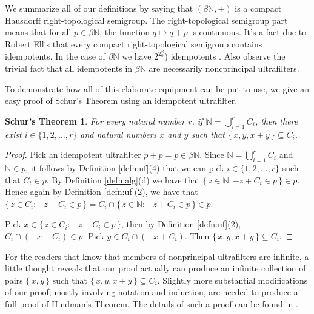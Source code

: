 \documentclass[12pt]{article}
\theoremstyle{plain}
\newtheorem{schur}[thm]{Schur's Theorem}
\theoremstyle{definition}
\newcommand{\bbN}{\mathbb{N}}
\begin{document}
We summarize all of our definitions by saying that $(\beta\bbN,
+)$ is a compact Hausdorff right-topological semigroup. 
The right-topological semigroup part means that for all $p \in
\beta\bbN$, the function $q \mapsto q+p$ is continuous.
It's a fact due to Robert Ellis \cite[Corollary 2.10]{Ellis:1969zr}
that every compact right-topological semigroup contains idempotents. 
In the case of $\beta\bbN$ we have 
$2^{2^\aleph_0}$) idempotents \cite[Theorem
6.44]{Hindman:1998fk}. 
Also observe the trivial fact that all idempotents in $\beta\bbN$ are
necessarily noncprincipal ultrafilters. 

To demonstrate how all of this elaborate equipment can be put to use,
we give an easy proof of Schur's Theorem using an idempotent ultrafilter.

  \begin{schur}
    For every natural number $r$, if  \/ $\bbN = \bigcup_{i=1}^r C_i$,
    then there exist $i \in \{1, 2, \ldots, r\}$ and natural numbers
    $x$ and $y$ such that $\{\, x, y, x+y \,\} \subseteq C_i$.
  \end{schur}
  \begin{proof}
    Pick an idempotent ultrafilter $p + p = p \in \beta\bbN$. 
    Since $\bbN = \bigcup_{i=1}^r C_i$ and $\bbN \in p$, it follows by
    Definition \ref{defn:uf}(4) that we can pick $i \in \{1, 2, \ldots,
    r\}$ such that $C_i \in p$. 
    By Definition \ref{defn:alg}(d) we have that $\{\, z \in \bbN : -z
    + C_i \in p \,\} \in p$.
    Hence again by Definition \ref{defn:uf}(2), we have that $\{\, z \in
    C_i : -z + C_i \in p \,\} = C_i \cap
    \{\, z \in \bbN : -z + C_i \in p \,\} \in p$.

    Pick $x \in \{\,z \in C_i: -z + C_i \in p \,\}$, then by
    Definition \ref{defn:uf}(2), $C_i \cap (-x+C_i) \in p$.
    Pick $y \in C_i \cap (-x+C_i)$.
    Then $\{\, x, y, x+y\,\} \subseteq C_i$.
  \end{proof}
For the readers that know that members of nonprincipal ultrafilters
are infinite, a little thought reveals that our proof actually can
produce an infinite collection of pairs $\{\,x,y\,\}$ such that
$\{\,x, y, x+y \,\} \subseteq C_i$. 
Slightly more substantial modifications of our proof, mostly involving
notation and induction, are needed to produce a full proof of
Hindman's Theorem. 
The details of such a proof can be found in \cite[Theorem
5.8]{Hindman:1998fk}.
\end{document}

